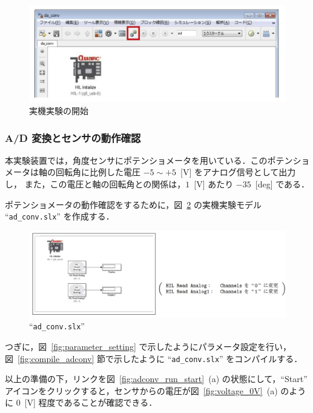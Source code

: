         \begin{figure}[H]
            \centering
            \includegraphics[width=0.85\linewidth]{figure/experiment_start.pdf}
            \caption{実機実験の開始}
            \label{fig:experiment_start}
        \end{figure}
        
        \subsubsection{A/D 変換とセンサの動作確認}

        本実験装置では，角度センサにポテンショメータを用いている．このポテンショメータは軸の回転角に比例した電圧 $-5 \sim +5$~[V] をアナログ信号として出力し，
        また，この電圧と軸の回転角との関係は，$1$~[V] あたり $-35$~[deg] である．
        
        ポテンショメータの動作確認をするために，図~\ref{fig:ad_conv_model} の実機実験モデル “\texttt{ad\_conv.slx}” を作成する．
        
        \begin{figure}[H]
            \centering
            \includegraphics[width=0.9\linewidth]{figure/ad_conv_model.pdf}
            \caption{“\texttt{ad\_conv.slx}”}
            \label{fig:ad_conv_model}
        \end{figure}
        
        つぎに，図~\ref{fig:parameter_setting} で示したようにパラメータ設定を行い，図~\ref{fig:compile_adconv} 節で示したように “\texttt{ad\_conv.slx}” をコンパイルする．

        以上の準備の下，リンクを図~\ref{fig:adconv_run_start}~(a) の状態にして，“Start” アイコンをクリックすると，センサからの電圧が図~\ref{fig:voltage_0V}~(a) のように $0$~[V] 程度であることが確認できる．
        
